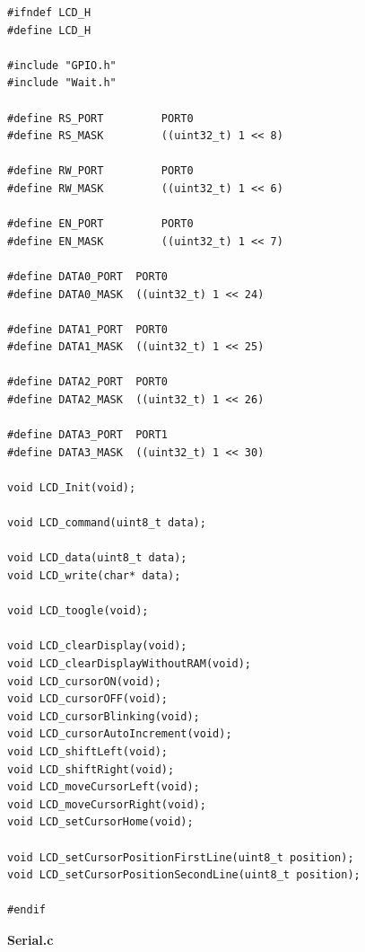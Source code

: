 \documentclass{article}
\begin{document}
\begin{lstlisting}
#ifndef LCD_H
#define LCD_H

#include "GPIO.h"
#include "Wait.h"

#define RS_PORT			PORT0
#define RS_MASK			((uint32_t) 1 << 8)

#define RW_PORT			PORT0
#define RW_MASK			((uint32_t) 1 << 6)

#define EN_PORT			PORT0
#define EN_MASK			((uint32_t) 1 << 7)

#define DATA0_PORT	PORT0
#define DATA0_MASK	((uint32_t) 1 << 24)

#define DATA1_PORT	PORT0
#define DATA1_MASK	((uint32_t) 1 << 25)

#define DATA2_PORT	PORT0
#define DATA2_MASK	((uint32_t) 1 << 26)

#define DATA3_PORT	PORT1
#define DATA3_MASK	((uint32_t) 1 << 30)

void LCD_Init(void);

void LCD_command(uint8_t data);

void LCD_data(uint8_t data);
void LCD_write(char* data);

void LCD_toogle(void);

void LCD_clearDisplay(void);
void LCD_clearDisplayWithoutRAM(void);
void LCD_cursorON(void);
void LCD_cursorOFF(void);
void LCD_cursorBlinking(void);
void LCD_cursorAutoIncrement(void);
void LCD_shiftLeft(void);
void LCD_shiftRight(void);
void LCD_moveCursorLeft(void);
void LCD_moveCursorRight(void);
void LCD_setCursorHome(void);

void LCD_setCursorPositionFirstLine(uint8_t position);
void LCD_setCursorPositionSecondLine(uint8_t position);

#endif

\end{lstlisting}
\linebreak
\textbf{Serial.c}
\end{document}
